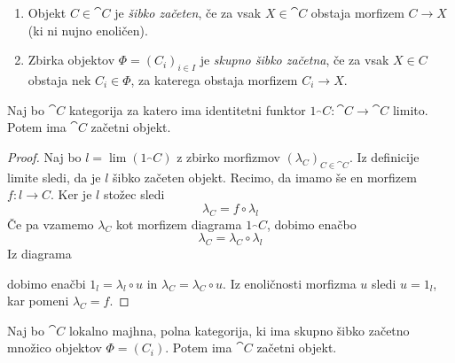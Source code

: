 \documentclass[../kategoricna_logika.tex]{subfiles}
\begin{document}
\begin{definicija}
\mbox{}
\begin{enumerate}[label=(\roman*)]
\item Objekt $C \in \cat{C}$ je \emph{šibko začeten}, če za vsak $X \in \cat{C}$ obstaja morfizem $C \to X$ (ki ni nujno enoličen).
\item Zbirka objektov $\Phi = (C_i)_{i \in I}$ je \emph{skupno šibko začetna}, če za vsak $X \in C$ obstaja nek $C_i \in \Phi$, za katerega obstaja morfizem $C_i \to X$.
\end{enumerate}
\end{definicija}
\begin{lema}
Naj bo $\cat{C}$ kategorija za katero ima identitetni funktor $1_\cat{C} : \cat{C} \to \cat{C}$ limito. Potem ima $\cat{C}$ začetni objekt.
\end{lema}
\begin{proof}
Naj bo $l = \lim (1_\cat{C})$ z zbirko morfizmov $(\lambda_C)_{C \in \cat{C}}$. Iz definicije limite sledi, da je $l$ šibko začeten objekt. Recimo, da imamo še en morfizem $f : l \to C$. Ker je $l$ stožec sledi
$$ \lambda_C  = f \circ \lambda_l$$
Če pa vzamemo $\lambda_C$ kot morfizem diagrama $1_\cat{C}$, dobimo enačbo
$$\lambda_C = \lambda_C \circ \lambda_l$$
Iz diagrama
\begin{center}
\end{center}
dobimo enačbi $1_l = \lambda_l \circ u$ in $\lambda_C = \lambda_C \circ u$. Iz enoličnosti morfizma $u$ sledi $u = 1_l$, kar pomeni $\lambda_C = f$.
\end{proof}
\begin{lema} \label{lema1}
Naj bo $\cat{C}$ lokalno majhna, polna kategorija, ki ima skupno šibko začetno množico objektov $\Phi = (C_i)$. Potem ima $\cat{C}$ začetni objekt.
\end{lema}
\end{document}
